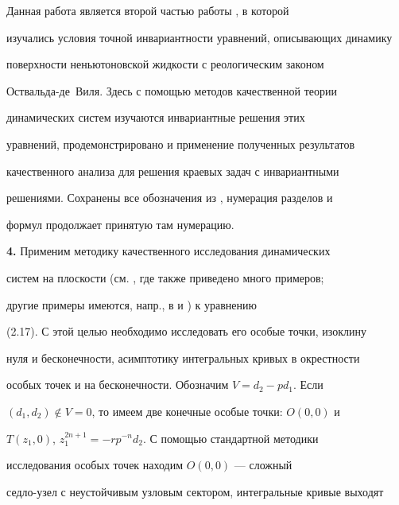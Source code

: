 \maketitle  


\label{begin}  


 


 


Данная работа является второй частью работы \cite{1}, в которой 


изучались условия точной инвариантности уравнений, описывающих динамику 


поверхности неньютоновской жидкости с реологическим законом 


Оствальда-де~Виля. Здесь с помощью методов качественной теории 


динамических систем \cite{2} изучаются инвариантные решения этих 


уравнений, продемонстрировано и применение полученных результатов 


качественного анализа для решения краевых задач с инвариантными 


решениями. Сохранены все обозначения из \cite{1}, нумерация разделов и 


формул продолжает принятую там нумерацию. 


\medskip 


 


{\bf 4.} Применим методику качественного исследования динамических 


систем на плоскости (см. \cite{2}, где также приведено много примеров; 


другие примеры имеются, напр., в \cite{3} и \cite{4}) к уравнению 


(2.17). С этой целью необходимо исследовать его особые точки, изоклину 


нуля и бесконечности, асимптотику интегральных кривых в окрестности 


особых точек и на бесконечности. Обозначим $V=d_2-pd_1$. Если 


$(d_1,d_2)\notin V=0$, то имеем две конечные особые точки: $O(0,0)$ и 


$T(z_1,0)$, $z^{2n+1}_1=-rp^{-n}d_2$. С помощью стандартной методики 


исследования особых точек \cite{2} находим $O(0,0)$ --- сложный 


седло-узел с неустойчивым узловым сектором, интегральные кривые выходят 


